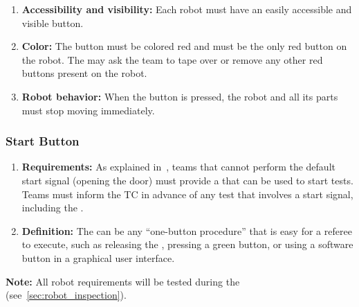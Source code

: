\begin{enumerate}
	\item \textbf{Accessibility and visibility:} Each robot must have an easily accessible and visible \EmergencyStop{} button.
	\item \textbf{Color:} The \EmergencyStop{} button must be colored red and must be the only red button on the robot.
	The \TC{} may ask the team to tape over or remove any other red buttons present on the robot.
	\item \textbf{Robot behavior:} When the \EmergencyStop{} button is pressed, the robot and all its parts must stop moving immediately.
\end{enumerate}

\subsubsection{Start Button}\label{rule:start_button}

\begin{enumerate}
	\item \textbf{Requirements:} As explained in~, teams that cannot perform the default start signal (opening the door) must provide a \StartButton{} that can be used to start tests.
	Teams must inform the TC in advance of any test that involves a start signal, including the \RobotInspection{}.
	\item \textbf{Definition:} The \StartButton{} can be any \enquote{one-button procedure} that is easy for a referee to execute, such as releasing the \EmergencyStop{}, pressing a green button, or using a software button in a graphical user interface.
\end{enumerate}

\noindent\textbf{Note:} All robot requirements will be tested during the \RobotInspection{} (see~\ref{sec:robot_inspection}).


